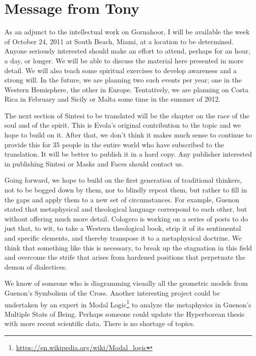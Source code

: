 \section{Message from Tony}

As an adjunct to the intellectual work on Gornahoor, I will be available the week of October 24, 2011 at South Beach, Miami, at a location to be determined. Anyone seriously interested should make an effort to attend, perhaps for an hour, a day, or longer. We will be able to discuss the material here presented in more detail. We will also teach some spiritual exercises to develop awareness and a strong will. In the future, we are planning two such events per year; one in the Western Hemisphere, the other in Europe. Tentatively, we are planning on Costa Rica in February and Sicily or Malta some time in the summer of 2012.

The next section of Sintesi to be translated will be the chapter on the race of the soul and of the spirit. This is Evola's original contribution to the topic and we hope to build on it. After that, we don't think it makes much sense to continue to provide this for 35 people in the entire world who have subscribed to the translation. It will be better to publish it in a hard copy. Any publisher interested in publishing Sintesi or Masks and Faces should contact us.

Going forward, we hope to build on the first generation of traditional thinkers, not to be bogged down by them, nor to blindly repeat them, but rather to fill in the gaps and apply them to a new set of circumstances. For example, Guenon stated that metaphysical and theological language correspond to each other, but without offering much more detail. Cologero is working on a series of posts to do just that, to wit, to take a Western theological book, strip it of its sentimental and specific elements, and thereby transpose it to a metaphysical doctrine. We think that something like this is necessary, to break up the stagnation in this field and overcome the strife that arises from hardened positions that perpetuate the demon of dialectices.

We know of someone who is diagramming visually all the geometric models from Guenon's Symbolism of the Cross. Another interesting project could be undertaken by an expert in Modal Logic\footnote{\url{https://en.wikipedia.org/wiki/Modal\_logic}} to analyze the metaphysics in Guenon's Multiple Stats of Being. Perhaps someone could update the Hyperborean thesis with more recent scientific data. There is no shortage of topics.



